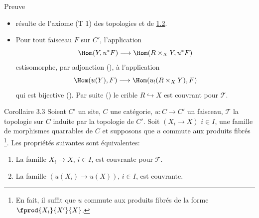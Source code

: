 \documentclass[10pt]{../fichiers-configuration-latex/smfart}
\begin{document}
\begin{enonce*}[remark]{Preuve}
\begin{itemize} %
\item[i) $\Rightarrow$ ii):] résulte de l'axiome (T 1) des topologies
  et de \hyperref[III.prop1.2]{1.2}.

\item[ii) $\Rightarrow$ i):] Pour tout faisceau $F$ sur $C'$,
  l'application
$$
\Hom(Y,u^{\ast}F)\longrightarrow \Hom(R\times_X Y, u^{\ast}F)
$$
est\pageoriginale isomorphe, par adjonction (), à
l'application
$$
\Hom(u(Y),F)\longrightarrow \Hom(u_{!}(R\times_X Y),F)
$$
qui est bijective (). Par suite ()
le crible $R\hookrightarrow X$ est couvrant pour $𝒯$.
\end{itemize}
\end{enonce*}

\begin{enonce*}{Corollaire 3.3}
Soient $C'$ un site, $C$ une catégorie, $u:C\rightarrow C'$ un
faisceau, $𝒯$ la topologie sur $C$ induite par la topologie de
$C'$. Soit $(X_i\rightarrow X)$ $i\in I$, une famille de morphismes
quarrables de $C$ et supposons que $u$ commute aux produits fibrés
\footnote[2]{En fait, il suffit que $u$ commute aux produits fibrés
  de la forme $\fprod{X_i}{X'}{X}$.}. Les propriétés suivantes
sont équivalentes:
\begin{enumerate}
\renewcommand{\theenumi}{\roman{enumi}}
\renewcommand{\labelenumi}{\theenumi)}
\item La famille $X_i\rightarrow X$, $i\in I$, est couvrante pour
  $𝒯$.

\item La famille $(u(X_i)\rightarrow u(X))$, $i\in I$, est couvrante.
\end{enumerate}
\end{enonce*}
\end{document}

